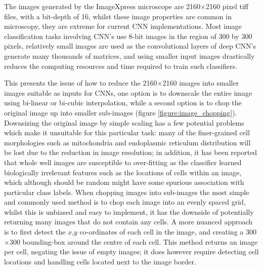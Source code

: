 \documentclass[a4paper,11pt,twoside,openright]{scrbook}
\begin{document}
The images generated by the ImageXpress microscope are 2160$\times$2160 pixel tiff files, with a bit-depth of 16, 
whilst these image properties are common in microscopy, they are extreme for current CNN implementations.
Most image classification tasks involving CNN's use 8-bit images in the region of 300 by 300 pixels, relatively small 
images are used as the convolutional layers of deep CNN's generate many thousands of matrices, and using smaller input 
images drastically reduces the computing resources and time required to train such classifiers.

This presents the issue of how to reduce the 2160$\times$2160 images into smaller images suitable as inputs for CNNs, 
one option is to downscale the entire image using bi-linear or bi-cubic interpolation, while a second option is to chop 
the original image up into smaller sub-images (figure \ref{figure:image_chopping}).
Downsizing the original image by simple scaling has a few potential problems which make it unsuitable for this 
particular task:
    many of the finer-grained cell morphologies such as mitochondria and endoplasmic reticulum distribution will be 
lost due to the reduction in image resolution;
    in addition, it has been reported that whole well images are susceptible to over-fitting as the classifier learned 
biologically irrelevant features such as the locations of cells within an image, which although should be random might 
have some spurious association with particular class labels.
When chopping images into sub-images the most simple and commonly used method is to chop each image into an evenly 
spaced grid, whilst this is unbiased and easy to implement, it has the downside of potentially returning many images 
that do not contain any cells.
A more nuanced approach is to first detect the $x$,$y$ co-ordinates of each cell in the image, and creating a 
300$\times$300 bounding-box around the centre of each cell.
This method returns an image per cell, negating the issue of empty images; it does however require detecting cell 
locations and handling cells located next to the image border.
\end{document}
